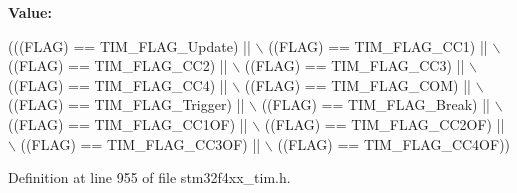 {\bfseries Value\+:}
\begin{DoxyCode}
(((FLAG) == TIM\_FLAG\_Update) || \(\backslash\)
                               ((FLAG) == TIM\_FLAG\_CC1) || \(\backslash\)
                               ((FLAG) == TIM\_FLAG\_CC2) || \(\backslash\)
                               ((FLAG) == TIM\_FLAG\_CC3) || \(\backslash\)
                               ((FLAG) == TIM\_FLAG\_CC4) || \(\backslash\)
                               ((FLAG) == TIM\_FLAG\_COM) || \(\backslash\)
                               ((FLAG) == TIM\_FLAG\_Trigger) || \(\backslash\)
                               ((FLAG) == TIM\_FLAG\_Break) || \(\backslash\)
                               ((FLAG) == TIM\_FLAG\_CC1OF) || \(\backslash\)
                               ((FLAG) == TIM\_FLAG\_CC2OF) || \(\backslash\)
                               ((FLAG) == TIM\_FLAG\_CC3OF) || \(\backslash\)
                               ((FLAG) == TIM\_FLAG\_CC4OF))
\end{DoxyCode}


Definition at line 955 of file stm32f4xx\+\_\+tim.\+h.

